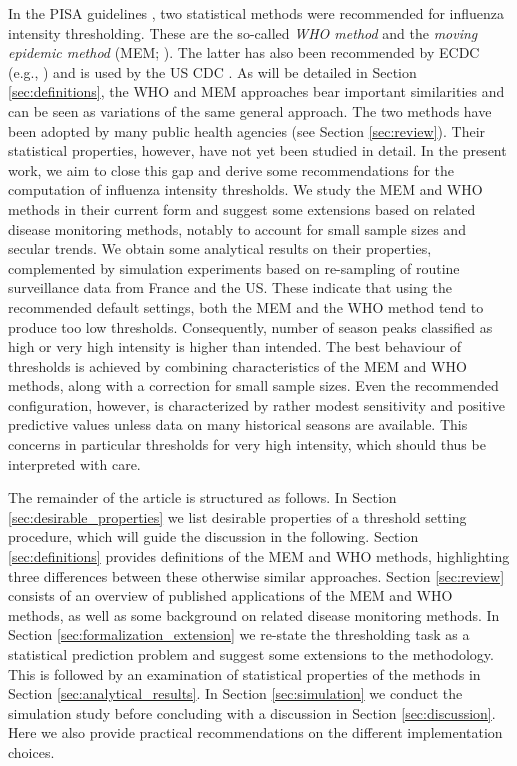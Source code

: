 \documentclass[12pt]{article}
\begin{document}
In the PISA guidelines \citep{WHO2017}, two statistical methods were recommended for influenza intensity thresholding. These are the so-called \textit{WHO method} \citep{WHO2014} and the \textit{moving epidemic method} (MEM; \citealt{Vega2015}). The latter has also been recommended by ECDC (e.g., \citealt{ECDC2017}) and is used by the US CDC \citep{Biggerstaff2017}. As will be detailed in Section \ref{sec:definitions}, the WHO and MEM approaches bear important similarities and can be seen as variations of the same general approach. The two methods have been adopted by many public health agencies (see Section \ref{sec:review}). Their statistical properties, however, have not yet been studied in detail. In the present work, we aim to close this gap and derive some recommendations for the computation of influenza intensity thresholds. We study the MEM and WHO methods in their current form and suggest some extensions based on related disease monitoring methods, notably to account for small sample sizes and secular trends. We obtain some analytical results on their properties, complemented by simulation experiments based on re-sampling of routine surveillance data from France and the US. These indicate that using the recommended default settings, both the MEM and the WHO method tend to produce too low thresholds. Consequently, number of season peaks classified as high or very high intensity is higher than intended. The best behaviour of thresholds is achieved by combining characteristics of the MEM and WHO methods, along with a correction for small sample sizes. Even the recommended configuration, however, is characterized by rather modest sensitivity and positive predictive values unless data on many historical seasons are available. This concerns in particular thresholds for very high intensity, which should thus be interpreted with care. %

The remainder of the article is structured as follows. In Section \ref{sec:desirable_properties} we list desirable properties of a threshold setting procedure, which will guide the discussion in the following. Section \ref{sec:definitions} provides definitions of the MEM and WHO methods, highlighting three differences between these otherwise similar approaches. Section \ref{sec:review} consists of an overview of published applications of the MEM and WHO methods, as well as some background on related disease monitoring methods. In Section \ref{sec:formalization_extension} we re-state the thresholding task as a statistical prediction problem and suggest some extensions to the methodology. This is followed by an examination of statistical properties of the methods in Section \ref{sec:analytical_results}. In Section \ref{sec:simulation} we conduct the simulation study before concluding with a discussion in Section \ref{sec:discussion}. Here we also provide practical recommendations on the different implementation choices.
\end{document}
